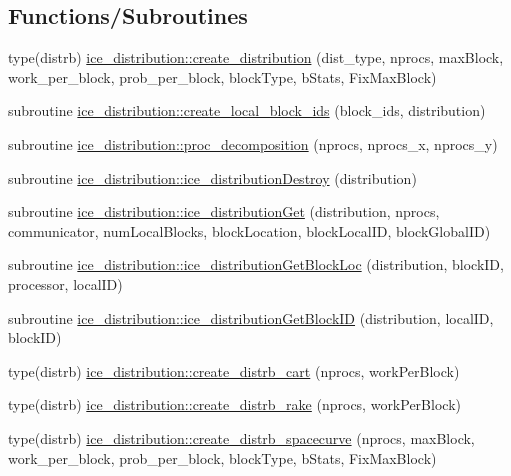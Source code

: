 \subsection*{Functions/Subroutines}
\begin{DoxyCompactItemize}
\item 
type(distrb) \hyperlink{namespaceice__distribution_aa44f38ec08146a52959957cbad5b093d}{ice\_\-distribution::create\_\-distribution} (dist\_\-type, nprocs, maxBlock, work\_\-per\_\-block, prob\_\-per\_\-block, blockType, bStats, FixMaxBlock)
\item 
subroutine \hyperlink{namespaceice__distribution_a8f328e752d1852d365225748260e0729}{ice\_\-distribution::create\_\-local\_\-block\_\-ids} (block\_\-ids, distribution)
\item 
subroutine \hyperlink{namespaceice__distribution_a53b1d1fb3c8ddf978561163a12c8b1a4}{ice\_\-distribution::proc\_\-decomposition} (nprocs, nprocs\_\-x, nprocs\_\-y)
\item 
subroutine \hyperlink{namespaceice__distribution_ae535b4181fd7a39a623c9b02de3c1fcf}{ice\_\-distribution::ice\_\-distributionDestroy} (distribution)
\item 
subroutine \hyperlink{namespaceice__distribution_af81cb7cb3d7c4651703ab5141b5a98d1}{ice\_\-distribution::ice\_\-distributionGet} (distribution, nprocs, communicator, numLocalBlocks, blockLocation, blockLocalID, blockGlobalID)
\item 
subroutine \hyperlink{namespaceice__distribution_a07a309ffe5759ad00fc5f886ce65c175}{ice\_\-distribution::ice\_\-distributionGetBlockLoc} (distribution, blockID, processor, localID)
\item 
subroutine \hyperlink{namespaceice__distribution_a9a144b7580fefe29842479948f00f810}{ice\_\-distribution::ice\_\-distributionGetBlockID} (distribution, localID, blockID)
\item 
type(distrb) \hyperlink{namespaceice__distribution_a879fa1e845de0c882360a4e48c1ff50d}{ice\_\-distribution::create\_\-distrb\_\-cart} (nprocs, workPerBlock)
\item 
type(distrb) \hyperlink{namespaceice__distribution_aa5edcd4e7149b4d79d4b503b37607e9a}{ice\_\-distribution::create\_\-distrb\_\-rake} (nprocs, workPerBlock)
\item 
type(distrb) \hyperlink{namespaceice__distribution_af881e23fc62ccdac1da09fed38e55236}{ice\_\-distribution::create\_\-distrb\_\-spacecurve} (nprocs, maxBlock, work\_\-per\_\-block, prob\_\-per\_\-block, blockType, bStats, FixMaxBlock)
\item 

\end{DoxyCompactItemize}
